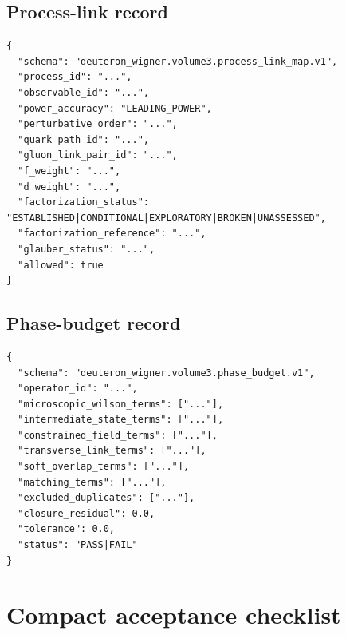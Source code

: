 \documentclass[11pt]{article}
\begin{document}
\subsection{Process-link record}

\begin{verbatim}
{
  "schema": "deuteron_wigner.volume3.process_link_map.v1",
  "process_id": "...",
  "observable_id": "...",
  "power_accuracy": "LEADING_POWER",
  "perturbative_order": "...",
  "quark_path_id": "...",
  "gluon_link_pair_id": "...",
  "f_weight": "...",
  "d_weight": "...",
  "factorization_status": "ESTABLISHED|CONDITIONAL|EXPLORATORY|BROKEN|UNASSESSED",
  "factorization_reference": "...",
  "glauber_status": "...",
  "allowed": true
}
\end{verbatim}

\subsection{Phase-budget record}

\begin{verbatim}
{
  "schema": "deuteron_wigner.volume3.phase_budget.v1",
  "operator_id": "...",
  "microscopic_wilson_terms": ["..."],
  "intermediate_state_terms": ["..."],
  "constrained_field_terms": ["..."],
  "transverse_link_terms": ["..."],
  "soft_overlap_terms": ["..."],
  "matching_terms": ["..."],
  "excluded_duplicates": ["..."],
  "closure_residual": 0.0,
  "tolerance": 0.0,
  "status": "PASS|FAIL"
}
\end{verbatim}

\section{Compact acceptance checklist}
\label{app:checklist}
\end{document}
